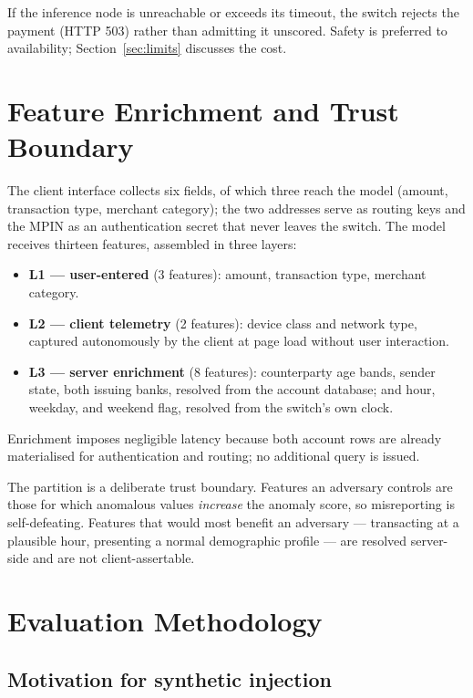 \documentclass[journal]{IEEEtran}
\begin{document}
If the inference node is unreachable or exceeds its timeout, the switch
rejects the payment (HTTP 503) rather than admitting it unscored. Safety is
preferred to availability; Section~\ref{sec:limits} discusses the cost.

\section{Feature Enrichment and Trust Boundary}
\label{sec:enrich}

The client interface collects six fields, of which three reach the model
(amount, transaction type, merchant category); the two addresses serve as
routing keys and the MPIN as an authentication secret that never leaves the
switch. The model receives thirteen features, assembled in three layers:

\begin{itemize}
\item \textbf{L1 --- user-entered} (3 features): amount, transaction type,
merchant category.
\item \textbf{L2 --- client telemetry} (2 features): device class and network
type, captured autonomously by the client at page load without user
interaction.
\item \textbf{L3 --- server enrichment} (8 features): counterparty age
bands, sender state, both issuing banks, resolved from the account database;
and hour, weekday, and weekend flag, resolved from the switch's own clock.
\end{itemize}

Enrichment imposes negligible latency because both account rows are already
materialised for authentication and routing; no additional query is issued.

The partition is a deliberate trust boundary. Features an adversary controls
are those for which anomalous values \emph{increase} the anomaly score, so
misreporting is self-defeating. Features that would most benefit an
adversary --- transacting at a plausible hour, presenting a normal
demographic profile --- are resolved server-side and are not client-assertable.

\section{Evaluation Methodology}
\label{sec:method}

\subsection{Motivation for synthetic injection}
\end{document}
